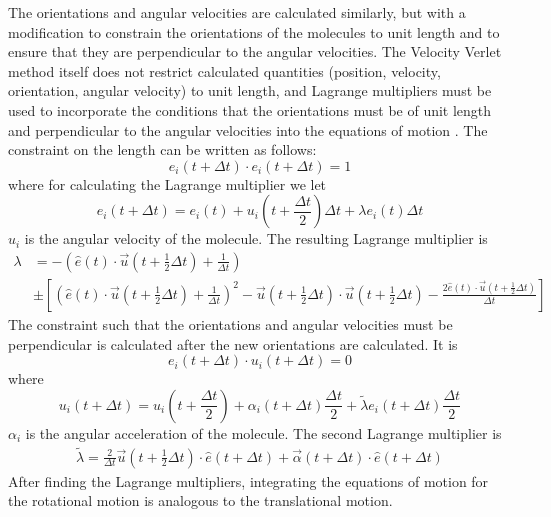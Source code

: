 \documentclass[preprint, aps]{revtex4-1}
\begin{document}
The orientations and angular velocities are calculated similarly, but with a
modification to constrain the orientations of the molecules to unit length and
to ensure that they are perpendicular to the angular velocities. The Velocity 
Verlet method itself does not restrict calculated quantities (position, 
velocity, orientation, angular velocity) to unit length, and Lagrange 
multipliers must be used to incorporate the conditions that the orientations
must be of unit length and perpendicular to the angular velocities into the 
equations of motion \cite{allen87}. The constraint on the length can be written 
as follows:
	\begin{equation} \label{unit-length}
		e_i(t+\Delta t)  \cdot e_i(t+\Delta t) = 1
	\end{equation}
where for calculating the Lagrange multiplier we let
	\begin{equation} \label{vv-e}
		e_i(t+\Delta t) 
		= e_i(t) 
		+ u_i(t + \frac{\Delta t}{2})\Delta t 
		+ \lambda e_i(t) \Delta t
	\end{equation}
$u_i$ is the angular velocity of the molecule. The resulting Lagrange multiplier 
is 
	\begin{equation} \label{lagrange-1}
		\begin{align}
			\lambda 
			& = -\left(\hat{e}(t) 
				\cdot \vec{u}(t+\frac{1}{2}\Delta t)+\frac{1}{\Delta t} 
			\right)\\
			& \pm \left[ 
				\left( \hat{e}(t) \cdot \vec{u}(t+\frac{1}{2}\Delta t)
				+ \frac{1}{\Delta t}
				\right)^2 
				- \vec{u}(t+\frac{1}{2}\Delta t) 
				\cdot \vec{u}(t+\frac{1}{2}\Delta t)
				- \frac{2 \hat{e}(t) \cdot \vec{u}(t+\frac{1}{2}\Delta t)}
				{\Delta t}
			\right]
		\end{align}
	\end{equation}
The constraint such that the orientations and angular velocities must be
perpendicular is calculated after the new orientations are calculated. It is
	\begin{equation} \label{eu-perp}
		e_i(t+\Delta t)  \cdot u_i(t+\Delta t)  = 0
	\end{equation}
where 
	\begin{equation} \label{vv-u}
		u_i(t+\Delta t) = u_i(t+\frac{\Delta t}{2}) 
		+ \alpha_i(t+\Delta t)\frac{\Delta t}{2} 
		+ \tilde{\lambda} e_i(t+\Delta t)\frac{\Delta t}{2}
	\end{equation}
$\alpha_i$ is the angular acceleration of the molecule. The second Lagrange
multiplier is
	\begin{equation} \label{lagrange-2}
		\begin{align}
			\tilde{\lambda} 
			= \frac{2}{\Delta t} \vec{u}(t + \frac{1}{2}\Delta t) 
			\cdot \hat{e}(t+\Delta t) 
			+ \vec{\alpha}(t + \Delta t) \cdot \hat{e} (t + \Delta t)
		\end{align}
	\end{equation}
After finding the Lagrange multipliers, integrating the equations of motion for
the rotational motion is analogous to the translational motion.
\end{document}
